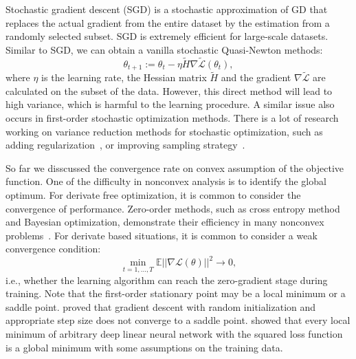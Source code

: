 \documentclass[a4paper,11pt]{article}
\begin{document}
Stochastic gradient descent (SGD) is a stochastic approximation of GD that replaces the actual gradient from the entire dataset by the estimation from a randomly selected subset. SGD is extremely efficient for large-scale datasets. Similar to SGD, we can obtain a vanilla stochastic Quasi-Newton methods: $$\theta_{t+1} := \theta_t - \eta \tilde{H} \nabla\tilde{\mathcal{L}}(\theta_t),$$ where $\eta$ is the learning rate, the Hessian matrix $\tilde{H}$ and the gradient $\nabla\tilde{\mathcal{L}}$ are calculated on the subset of the data. However, this direct method will lead to high variance, which is harmful to the learning procedure. A similar issue also occurs in first-order stochastic optimization methods. There is a lot of research working on variance reduction methods for stochastic optimization, such as adding regularization~\citep{johnson2013accelerating,byrd2016stochastic}, or improving sampling strategy~\citep{needell2014stochastic,zhao2015stochastic}.

So far we disscussed the convergence rate on convex assumption of the objective function. One of the difficulty in nonconvex analysis is to identify the global optimum. For derivate free optimization, it is common to consider the convergence of performance. Zero-order methods, such as cross entropy method and Bayesian optimization, demonstrate their efficiency in many nonconvex problems~\citep{rubinstein1999cross,wang2013bayesian}. For derivate based situations, it is common to consider a weak convergence condition: $$\min_{t=1,...,T}\mathbb{E}||\nabla\mathcal{L}(\theta)||^2 \rightarrow 0,$$ i.e., whether the learning algorithm can reach the zero-gradient stage during training. Note that the first-order stationary point may be a local minimum or a saddle point. \citet{lee2016gradient} proved that gradient descent with random initialization and appropriate step size does not converge to a saddle point. \citet{kawaguchi2016deep} showed that every local minimum of arbitrary deep linear neural network with the squared loss function is a global minimum with some assumptions on the training data.



 
\end{document}

